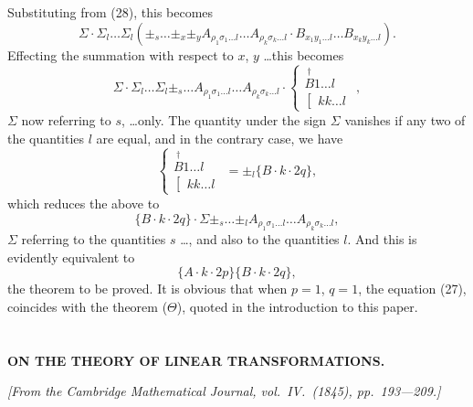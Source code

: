 \documentclass[11pt,a4paper]{article}
\theoremstyle{plain}
\theoremstyle{definition}
\theoremstyle{remark}
\begin{document}
Substituting from (28), this becomes
\[
\Sigma \cdot \Sigma_l \ldots \Sigma_l (\pm_s \ldots \pm_x \pm_y A_{\rho_1\sigma_1\ldots l} \ldots A_{\rho_k\sigma_k\ldots l} \cdot
B_{x_1y_1\ldots l} \ldots B_{x_ky_k\ldots l})
\tag{30}.
\]
Effecting the summation with respect to $x$, $y$ \ldots this becomes
\[
\Sigma \cdot \Sigma_l \ldots \Sigma_l \pm_s \ldots A_{\rho_1\sigma_1\ldots l} \ldots A_{\rho_k\sigma_k\ldots l} \cdot
\left\{\begin{array}{c}
\stackrel{\dagger}{B} 1 \ldots l \\
\left[\begin{array}{c}
kk \ldots l
\end{array}\right.
\end{array}\right.
\tag{31},
\]
$\Sigma$ now referring to $s$, \ldots only. The quantity under the sign $\Sigma$ vanishes if any two
of the quantities $l$ are equal, and in the contrary case, we have
\[
\left\{\begin{array}{c}
\stackrel{\dagger}{B} 1 \ldots l \\
\left[\begin{array}{c}
kk \ldots l
\end{array}\right.
\end{array}\right.
= \pm_l \{B \cdot k \cdot 2q\}
\tag{32},
\]
which reduces the above to
\[
\{B \cdot k \cdot 2q\} \cdot \Sigma \pm_s \ldots \pm_l A_{\rho_1\sigma_1\ldots l} \ldots A_{\rho_k\sigma_k\ldots l}
\tag{33},
\]
$\Sigma$ referring to the quantities $s$ \ldots, and also to the quantities $l$. And this is evidently
equivalent to
\[
\{A \cdot k \cdot 2p\} \{B \cdot k \cdot 2q\}
\tag{34},
\]
the theorem to be proved. It is obvious that when $p=1$, $q=1$, the equation (27),
coincides with the theorem ($\Theta$), quoted in the introduction to this paper.

\newpage
\setcounter{section}{12}


\section{}
\begin{center}
\textbf{ON THE THEORY OF LINEAR TRANSFORMATIONS.}
\end{center}
\textit{[From the Cambridge Mathematical Journal, vol.\ IV.\ (1845), pp.\ 193---209.]}
\end{document}
